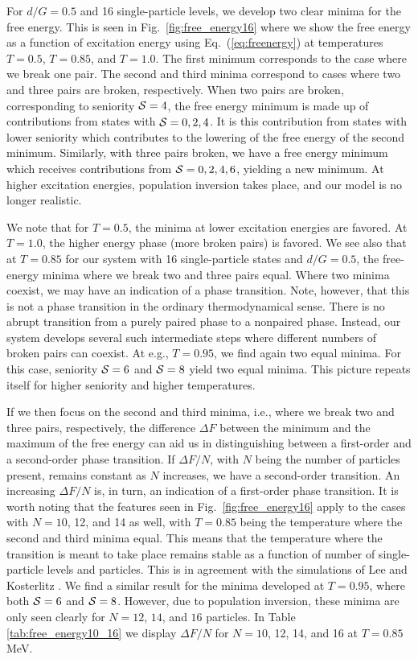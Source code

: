 \documentclass[preprint,rmp,aps,floatfix]{revtex4}
\begin{document}
For $d/G=0.5$ and 16 single-particle levels, 
we develop two clear  minima for the free energy.
This is seen in
Fig.~\ref{fig:free_energy16} where we show the free energy as a function of 
excitation energy
using Eq.~(\ref{eq:freenergy}) at temperatures $T=0.5$, $T=0.85$, and $T=1.0$.
The first minimum corresponds to the case where we break one pair.
The second and third minima  correspond
to cases where two and three pairs are broken, respectively. 
When two pairs are broken, corresponding to seniority ${\cal S}=4$, 
the free energy minimum is made up of contributions
from states with ${\cal S}=0,2,4$. It is this contribution from states 
with lower seniority which contributes to the lowering of the free
energy of the second minimum. Similarly, with three pairs
broken, we have a free energy minimum which receives contributions
from ${\cal S}=0,2,4,6$, yielding a new minimum. 
At higher excitation energies, population
inversion takes place, and our model is no longer realistic. 

We note that for $T=0.5$, the minima at lower excitation
energies are favored. 
At $T=1.0$, the higher energy
phase (more broken pairs) is favored.
We see also that at $T=0.85$ for our system with 
16 single-particle states and $d/G=0.5$,
the free-energy minima where we break two and three pairs 
equal. 
Where two minima coexist, we may have an
indication  of a phase transition. Note, however, that this is not a 
phase transition in the ordinary thermodynamical sense.
There is no abrupt transition from a purely paired phase to a 
nonpaired phase.  
Instead, our system develops several such intermediate steps
where different numbers of broken pairs can coexist. 
At e.g., $T=0.95$, we find again two equal minima. For this case,
seniority ${\cal S}=6$ and ${\cal S}=8$ yield two equal minima.
This picture repeats itself for higher seniority and higher temperatures.

If we then focus on the second and third minima, i.e., where we break
two and three pairs, respectively, the difference $\Delta F$ between the 
minimum and the maximum of the free energy can aid us in distinguishing
between a first-order and a second-order phase transition. If $\Delta F/N$,
with $N$ being the number of particles present, remains constant as $N$
increases, we have a second-order transition. An increasing $\Delta F/N$
is, in turn, an indication of a first-order phase transition. 
It is worth noting that the features
seen in Fig.~\ref{fig:free_energy16} apply to the cases with $N=10$, 12, 
and 14 as well, with $T=0.85$ being the temperature where the second and
third minima equal. This means that the temperature where the transition
is meant to take place remains stable as a function of number of single-particle
levels and particles. This is in agreement with the simulations of 
Lee and Kosterlitz \cite{lk90,lk91}. We find a similar result for the minima
developed at $T=0.95$, where both ${\cal S}=6$ and ${\cal S}=8$.
However, due to population inversion, these minima are only seen clearly
for $N=12$, $14$, and $16$ particles.
In Table \ref{tab:free_energy10_16} we display $\Delta F/N$ for 
$N=10$, 12, 14, and 16 at $T=0.85$ MeV. 
\end{document}
